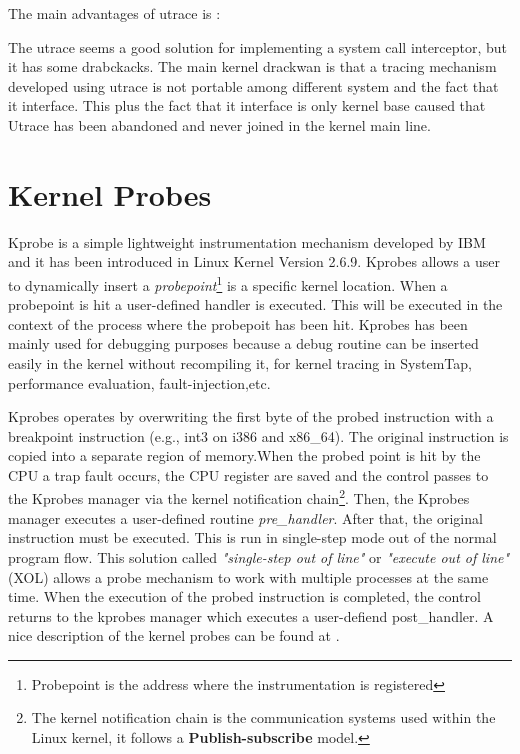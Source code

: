 The main advantages of utrace is : 

The utrace seems a good solution for implementing a system call interceptor, but it has some drabckacks. The main kernel drackwan is that a tracing mechanism developed using utrace is not portable among different system and the fact that it interface. This plus the fact that it interface is only kernel base caused that Utrace has been abandoned and never joined in the kernel main line. 


\section{Kernel Probes}
Kprobe \citep{Kprobes:2006} is a simple lightweight instrumentation mechanism developed by IBM and it has been introduced in Linux Kernel Version 2.6.9. Kprobes allows a user to dynamically insert a \textit{probepoint}\footnote{Probepoint is the address where the instrumentation is registered } is a specific kernel location. When a probepoint is hit a user-defined handler is executed. This will be executed in the context of the process where the probepoit has been hit. Kprobes has been mainly used for debugging purposes because a debug routine can be inserted easily in the kernel without recompiling it, for kernel tracing in SystemTap\citep{SystemTap:Online}, performance evaluation, fault-injection,etc.  
\par
Kprobes operates by overwriting the first byte of the probed instruction with a breakpoint instruction (e.g., int3 on i386 and x86\_64). The original instruction is copied into a separate region of memory.When the probed point is hit by the CPU a trap fault occurs, the CPU register are saved and the control passes to the Kprobes manager via the kernel notification chain\footnote{The kernel notification chain is the communication systems used within the Linux kernel, it follows a \textbf{Publish-subscribe} model.}.
Then, the Kprobes manager executes a user-defined routine \textit{pre\_handler}. After that, the original instruction must be executed. This is run in single-step mode out of the normal program flow. This solution called \textit{"single-step out of line"} or  \textit{"execute out of line"} (XOL) allows a probe mechanism to work with multiple processes at the same time. 
When the execution of the probed instruction is completed, the control returns to the kprobes manager which executes  a user-defiend post\_handler. A nice description of the kernel probes can be found at \citep{Sudhanshu:2006:Online}.  

